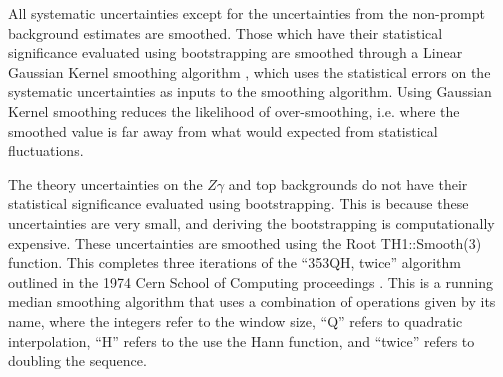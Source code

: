 All systematic uncertainties except for the uncertainties from the non-prompt background estimates are smoothed. Those which have their statistical significance evaluated using bootstrapping are smoothed through a Linear Gaussian Kernel smoothing algorithm \cite{VBSWy:kernelsmooth}, which uses the statistical errors on the systematic uncertainties as inputs to the smoothing algorithm. Using Gaussian Kernel smoothing reduces the likelihood of over-smoothing, i.e. where the smoothed value is far away from what would expected from statistical fluctuations.%

The theory uncertainties on the $Z\gamma$ and top backgrounds do not have their statistical significance evaluated using bootstrapping. This is because these uncertainties are very small, and deriving the bootstrapping is computationally expensive. These uncertainties are smoothed using the Root TH1::Smooth(3) function. This completes three iterations of the ``353QH, twice'' algorithm outlined in the 1974 Cern School of Computing proceedings \cite{VBSWy:thsmoothing}. This is a running median smoothing algorithm that uses a combination of operations given by its name, where the integers refer to the window size, ``Q'' refers to quadratic interpolation, ``H'' refers to the use the Hann function, and ``twice'' refers to doubling the sequence.

